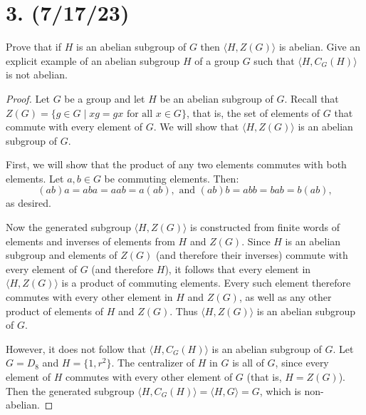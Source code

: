 \documentclass{article}
\begin{document}
\section*{3. (7/17/23)}

Prove that if $H$ is an abelian subgroup of $G$ then $\langle H, Z(G) \rangle$ is abelian. Give an explicit example of an abelian subgroup $H$ of a group $G$ such that $\langle H, C_G(H) \rangle$ is not abelian.

\begin{proof}
    Let $G$ be a group and let $H$ be an abelian subgroup of $G$. Recall that $Z(G) = \{ g \in G \mid xg = gx \text{ for all } x \in G \}$, that is, the set of elements of $G$ that commute with every element of $G$. We will show that $\langle H, Z(G) \rangle$ is an abelian subgroup of $G$.

    First, we will show that the product of any two elements commutes with both elements. Let $a, b \in G$ be commuting elements. Then:
    \begin{equation*}
        (ab)a = aba = aab = a(ab), \text{ and } (ab)b = abb = bab = b(ab),
    \end{equation*}
    as desired.

    Now the generated subgroup $\langle H, Z(G) \rangle$ is constructed from finite words of elements and inverses of elements from $H$ and $Z(G)$. Since $H$ is an abelian subgroup and elements of $Z(G)$ (and therefore their inverses) commute with every element of $G$ (and therefore $H$), it follows that every element in $\langle H, Z(G) \rangle$ is a product of commuting elements. Every such element therefore commutes with every other element in $H$ and $Z(G)$, as well as any other product of elements of $H$ and $Z(G)$. Thus $\langle H, Z(G) \rangle$ is an abelian subgroup of $G$.

    However, it does not follow that $\langle H, C_G(H) \rangle$ is an abelian subgroup of $G$. Let $G = D_8$ and $H = \{ 1, r^2 \}$. The centralizer of $H$ in $G$ is all of $G$, since every element of $H$ commutes with every other element of $G$ (that is, $H = Z(G)$). Then the generated subgroup $\langle H, C_G(H) \rangle = \langle H, G \rangle = G$, which is non-abelian.
\end{proof}
\end{document}
